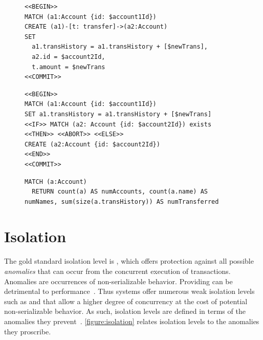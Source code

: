 \begin{figure}[htb]
\centering
\begin{minipage}{0.45\linewidth}
\begin{lstlisting}[language=cypher,label=fig:ac,caption=\tx{Atomicity-C Tx.}]
<<BEGIN>>
MATCH (a1:Account {id: $account1Id})
CREATE (a1)-[t: transfer]->(a2:Account)
SET
  a1.transHistory = a1.transHistory + [$newTrans],
  a2.id = $account2Id,
  t.amount = $newTrans
<<COMMIT>>
\end{lstlisting}
\end{minipage}
\quad
\begin{minipage}{0.52\linewidth}
\begin{lstlisting}[language=cypher,label=fig:arb,caption=\tx{Atomicity-RB Tx.}]
<<BEGIN>>
MATCH (a1:Account {id: $account1Id})
SET a1.transHistory = a1.transHistory + [$newTrans]
<<IF>> MATCH (a2: Account {id: $account2Id}) exists
<<THEN>> <<ABORT>> <<ELSE>>
CREATE (a2:Account {id: $account2Id})
<<END>>
<<COMMIT>>
\end{lstlisting}
\end{minipage}
\end{figure}


\begin{figure}[htb]
\centering
\begin{lstlisting}[language=cypher,label=fig:acheck,caption=\tx{Atomicity-C/Atomicity-RB:} counting entities in the graph.]
  MATCH (a:Account)
  RETURN count(a) AS numAccounts, count(a.name) AS numNames, sum(size(a.transHistory)) AS numTransferred
\end{lstlisting}
\end{figure}

\section{Isolation}
\label{sec:isolation}

The gold standard isolation level is , which offers 
protection against all possible \emph{anomalies} that can occur from the 
concurrent execution of transactions. Anomalies are occurrences of 
non-serializable behavior. Providing  can be detrimental
to performance~\cite{DBLP:conf/ds/GrayLPT76}. Thus systems offer numerous weak
isolation levels such as  and  
that allow a higher degree of concurrency at the cost of potential 
non-serializable behavior. As such, isolation levels are defined in terms of 
the anomalies they prevent~\cite{DBLP:conf/ds/GrayLPT76,DBLP:journals/pvldb/BailisDFGHS13}.
\autoref{figure:isolation} relates isolation levels to the anomalies they proscribe.

